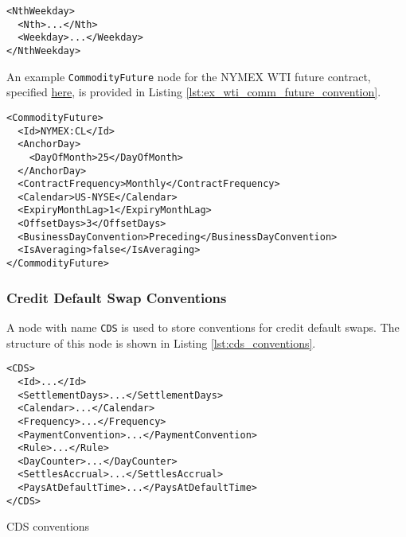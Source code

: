 \begin{listing}[h!]
\begin{verbatim}
<NthWeekday>
  <Nth>...</Nth>
  <Weekday>...</Weekday>
</NthWeekday>
\end{verbatim}
\caption{\textnormal{\lstinline!NthWeekday!} node outline}
\label{lst:nth_weekday_node}
\end{listing}

An example \lstinline!CommodityFuture! node for the NYMEX WTI future contract, specified \href{https://www.cmegroup.com/trading/energy/crude-oil/light-sweet-crude_contract_specifications.html}{here}, is provided in Listing \ref{lst:ex_wti_comm_future_convention}.

\begin{listing}[h!]
\begin{verbatim}
<CommodityFuture>
  <Id>NYMEX:CL</Id>
  <AnchorDay>
    <DayOfMonth>25</DayOfMonth>
  </AnchorDay>
  <ContractFrequency>Monthly</ContractFrequency>
  <Calendar>US-NYSE</Calendar>
  <ExpiryMonthLag>1</ExpiryMonthLag>
  <OffsetDays>3</OffsetDays>
  <BusinessDayConvention>Preceding</BusinessDayConvention>
  <IsAveraging>false</IsAveraging>
</CommodityFuture>
\end{verbatim}
\caption{NYMEX WTI \textnormal{\lstinline!CommodityFuture!} node}
\label{lst:ex_wti_comm_future_convention}
\end{listing}

\subsubsection{Credit Default Swap Conventions}
\label{sss:cds_conventions}
A node with name \lstinline!CDS! is used to store conventions for credit default swaps. The structure of this node is shown in Listing \ref{lst:cds_conventions}.

\begin{listing}[H]
\begin{verbatim}
<CDS>
  <Id>...</Id>
  <SettlementDays>...</SettlementDays>
  <Calendar>...</Calendar>
  <Frequency>...</Frequency>
  <PaymentConvention>...</PaymentConvention>
  <Rule>...</Rule>
  <DayCounter>...</DayCounter>
  <SettlesAccrual>...</SettlesAccrual>
  <PaysAtDefaultTime>...</PaysAtDefaultTime>
</CDS>
\end{verbatim}
\caption{CDS conventions}
\label{lst:cds_conventions}
\end{listing}

